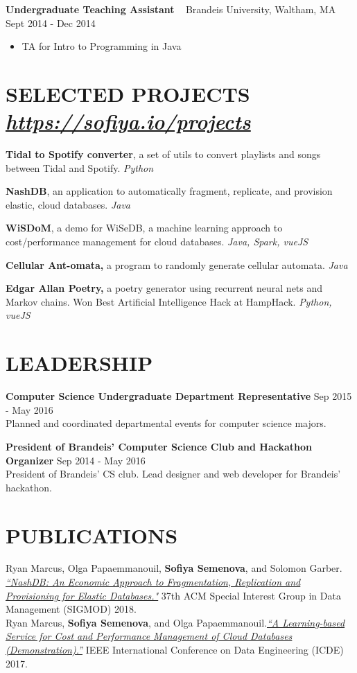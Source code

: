 \documentclass{res}
\begin{document}
\begin{resume}
\textbf{Undergraduate Teaching Assistant} ~ Brandeis University, Waltham, MA \hfill Sept 2014 - Dec 2014 \\ 
	\begin{itemize}  \itemsep -2pt %
	\item TA for Intro to Programming in Java
	\end{itemize}


\section{SELECTED PROJECTS ~  {\sl \href{https://sofiya.io/projects}{https://sofiya.io/projects}}}

\textbf{Tidal to Spotify converter}, a set of utils to convert playlists and songs between Tidal and Spotify.  {\sl Python} 

\textbf{NashDB}, an application to automatically fragment, replicate, and provision elastic, cloud databases. {\sl Java }

\textbf{WiSDoM}, a demo for WiSeDB, a machine learning approach to cost/performance management for cloud  databases. {\sl Java, Spark, vueJS}
	
\textbf{Cellular Ant-omata,} a program to randomly generate cellular automata. {\sl Java}
	
\textbf{Edgar Allan Poetry,} a poetry generator using recurrent neural nets and Markov chains. Won Best  Artificial Intelligence Hack at HampHack. {\sl Python, vueJS}

\section{LEADERSHIP}  

\textbf{Computer Science Undergraduate Department Representative} \hfill Sep 2015 - May 2016 \\
	Planned and coordinated departmental events for computer science majors.	

\textbf{President of Brandeis' Computer Science Club and Hackathon Organizer} \hfill Sep 2014 - May 2016 \\
	President of Brandeis' CS club. Lead designer and web developer for Brandeis' hackathon.
	
\section{PUBLICATIONS}             
	 Ryan Marcus, Olga Papaemmanouil, \textbf{Sofiya Semenova}, and Solomon Garber. \href{https://api.zotero.org/users/3604318/publications/items/35KTECTC/file/view}{\sl “NashDB: An Economic Approach to Fragmentation, Replication and Provisioning for Elastic Databases."} 37th ACM Special Interest Group in Data Management (SIGMOD) 2018. \\
	  Ryan Marcus, \textbf{Sofiya Semenova}, and Olga Papaemmanouil.\href{http://www.cs.brandeis.edu/~olga/publications/icde17-demo.pdf}{\sl “A Learning-based Service for Cost and Performance Management of Cloud Databases (Demonstration).”} IEEE International Conference on Data Engineering (ICDE) 2017.


\end{resume}
\end{document}
